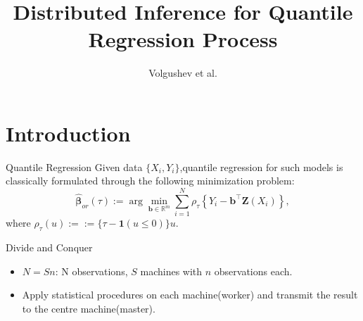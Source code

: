 \documentclass[11pt]{beamer}
\author{Volgushev et al.}
\title{Distributed Inference for Quantile Regression Process}
\begin{document}
\newcommand{\cX}{\mathcal{X}}
\begin{frame}
\titlepage
\end{frame}


\section{Introduction}
\begin{frame}{Quantile Regression}
Given data $\{X_i,Y_i\}$,quantile regression for such models is classically
formulated through the following minimization problem:
\begin{equation}\tag{1.1}
\widehat{\boldsymbol{\beta}}_{o r}(\tau):=\arg \min _{\mathbf{b} \in \mathbb{R}^{m}} \sum_{i=1}^{N} \rho_{\tau}\left\{Y_{i}-\mathbf{b}^{\top} \mathbf{Z}\left(X_{i}\right)\right\},
\end{equation}
where $\rho_{\tau}(u):=:=\{\tau-\mathbf{1}(u \leq 0)\} u$.


\end{frame}

\begin{frame}{Divide and Conquer}
\begin{itemize}
\item $N=Sn$: N observations, $S$ machines with $n$ observations each.
\item Apply statistical procedures on each machine(worker) and transmit the result to the centre machine(master).
\end{itemize}
\end{frame}
\end{document}
